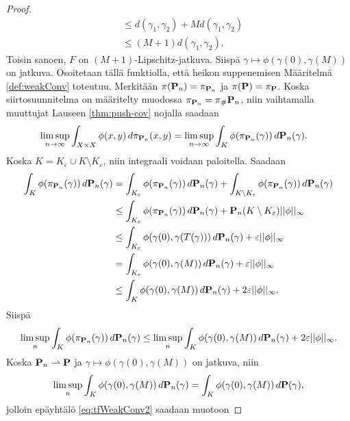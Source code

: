 \documentclass[12pt,oneside,a4paper]{amsbook} %
\begin{document}
\begin{proof}
\begin{align*}
        &\le  d(\gamma_1, \gamma_2) + Md(\gamma_1, \gamma_2) \\
        &\le (M+1)d(\gamma_1, \gamma_2).
    \end{align*}
    Toisin sanoen, $F$ on $(M+1)$-Lipschitz-jatkuva.
    Siispä $\gamma \mapsto \phi(\gamma(0), \gamma(M))$ on jatkuva. Osoitetaan tällä funktiolla, että heikon suppenemisen Määritelmä \ref{def:weakConv} toteutuu. Merkitään $\pi(\P_n) = \pi_{\P_n}$ ja $\pi(\P) = \pi_\P$.  Koska siirtosuunnitelma on määritelty muodossa $\pi_{\P_n} = \pi_\#\P_n$, niin vaihtamalla muuttujat Lauseen \ref{thm:push-cov} nojalla saadaan
    \begin{align*}
        \limsup_{n\to\infty} \int_{X \times X} \phi(x, y) \, d\pi_{\P_n} (x, y) &= \limsup_{n\to\infty} \int_{K} \phi(\pi_{\P_n}(\gamma)) \, d\P_n (\gamma).  
    \end{align*}
    Koska $K = K_\varepsilon \cup K \setminus K_\varepsilon$, niin integraali voidaan paloitella. Saadaan
    \begin{align*}
        \int_{K} \phi(\pi_{\P_n}(\gamma)) \, d\P_n (\gamma) &= \int_{K_\varepsilon} \phi(\pi_{\P_n}(\gamma)) \, d\P_n (\gamma) + \int_{K \setminus K_\varepsilon} \phi(\pi_{\P_n}(\gamma)) \, d\P_n (\gamma) \\
        &\le \int_{K_\varepsilon} \phi(\pi_{\P_n}(\gamma)) \, d\P_n (\gamma) + \P_n(K\setminus K_\varepsilon) ||\phi||_\infty\\
        &\le \int_{K_\varepsilon} \phi(\gamma(0),\gamma(T(\gamma))) \, d\P_n (\gamma) + \varepsilon||\phi||_\infty \\
        &=  \int_{K_\varepsilon} \phi(\gamma(0),\gamma(M)) \, d\P_n (\gamma) + \varepsilon||\phi||_\infty \\
        &\le \int_{K} \phi(\gamma(0),\gamma(M)) \, d\P_n (\gamma) + 2\varepsilon||\phi||_\infty.
    \end{align*}
Siispä 
    \begin{align} \label{eq:tfWeakConv2}
        \limsup_{n} \int_{K} \phi(\pi_{\P_n}(\gamma)) \, d\P_n (\gamma) \le \limsup_n \int_{K} \phi(\gamma(0),\gamma(M)) \, d\P_n (\gamma) + 2\varepsilon||\phi||_\infty.
    \end{align}
Koska $\P_n \rightharpoonup \P$ ja $\gamma \mapsto \phi(\gamma(0), \gamma(M))$ on jatkuva, niin 
    \begin{equation*}
        \limsup_n \int_{K} \phi(\gamma(0),\gamma(M)) \, d\P_n (\gamma) = \int_{K} \phi(\gamma(0),\gamma(M)) \, d\P (\gamma),
    \end{equation*}
jolloin epäyhtälö \eqref{eq:tfWeakConv2} saadaan muotoon

\end{proof}
\end{document}
